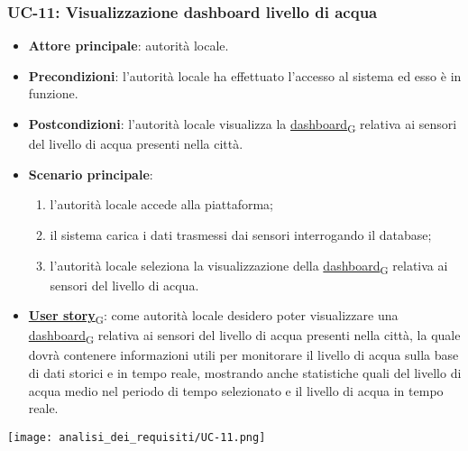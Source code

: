\subsubsection{UC-11: Visualizzazione dashboard livello di acqua}
\begin{itemize}
	\item \textbf{Attore principale}: autorità locale.
	\item \textbf{Precondizioni}: l'autorità locale ha effettuato l'accesso al sistema ed esso è in funzione.
	\item \textbf{Postcondizioni}: l'autorità locale visualizza la \href{https://7last.github.io/docs/pb/documentazione-interna/glossario\#dashboard}{dashboard\textsubscript{G}} relativa
	      ai sensori del livello di acqua presenti nella città.
	\item \textbf{Scenario principale}:
	      \begin{enumerate}
		      \item l'autorità locale accede alla piattaforma;
		      \item il sistema carica i dati trasmessi dai sensori interrogando il database;
		      \item l'autorità locale seleziona la visualizzazione della \href{https://7last.github.io/docs/pb/documentazione-interna/glossario\#dashboard}{dashboard\textsubscript{G}} relativa ai sensori del livello di acqua.
	      \end{enumerate}
	\item \href{https://7last.github.io/docs/pb/documentazione-interna/glossario\#user-story}{\textbf{User story}\textsubscript{G}}:
	      come autorità locale desidero poter visualizzare una \href{https://7last.github.io/docs/pb/documentazione-interna/glossario\#dashboard}{dashboard\textsubscript{G}} relativa ai sensori del livello di acqua presenti nella città, la quale
	      dovrà contenere informazioni utili per monitorare il livello di acqua sulla base di dati storici e in tempo reale, mostrando
	      anche statistiche quali del livello di acqua medio nel periodo di tempo selezionato e il livello di acqua in tempo reale.
\end{itemize}
\begin{center}
	\texttt{[image: analisi\_dei\_requisiti/UC-11.png]}
\end{center}


